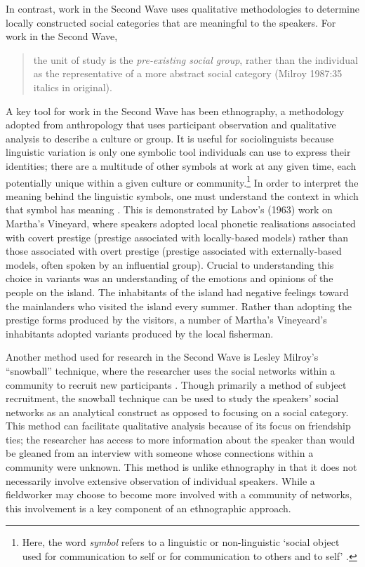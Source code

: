 In contrast, work in the Second Wave uses qualitative methodologies to determine locally constructed social categories that are meaningful to the speakers.  For work in the Second Wave,

\begin{quote}
	the unit of study is the \textit{pre-existing social group}, rather than the individual as the representative of a more abstract social category (Milroy 1987:35 italics in original).
\end{quote}\nocite{milroy1987}

\noindent A key tool for work in the Second Wave has been ethnography, a methodology adopted from anthropology that uses participant observation and qualitative analysis to describe a culture or group.  It is useful for sociolinguists because linguistic variation is only one symbolic tool individuals can use to express their identities; there are a multitude of other symbols at work at any given time, each potentially unique within a given culture or community.\footnote{Here, the word \textit{symbol} refers to a linguistic or non-linguistic `social object used for communication to self or for communication to others and to self' \cite[42]{charon1995}.}  In order to interpret the meaning behind the linguistic symbols, one must understand the context in which that symbol has meaning \cite[22]{savilletroike1982}.  This is demonstrated by Labov's (1963) work on Martha's Vineyard, where speakers adopted local phonetic realisations associated with covert prestige (prestige associated with locally-based models) rather than those associated with overt prestige (prestige associated with externally-based models, often spoken by an influential group).  Crucial to understanding this choice in variants was an understanding of the emotions and opinions of the people on the island.  The inhabitants of the island had negative feelings toward the mainlanders who visited the island every summer.  Rather than adopting the prestige forms produced by the visitors, a number of Martha's Vineyeard's inhabitants adopted variants produced by the local fisherman.  \nocite{labov1963}   

Another method used for research in the Second Wave is Lesley Milroy's ``snowball'' technique, where the researcher uses the social networks within a community to recruit new participants \cite[32]{milroygordon2003}.  Though primarily a method of subject recruitment, the snowball technique can be used to study the speakers' social networks as an analytical construct as opposed to focusing on a social category.  This method can facilitate qualitative analysis because of its focus on friendship ties; the researcher has access to more information about the speaker than would be gleaned from an interview with someone whose connections within a community were unknown.  This method is unlike ethnography in that it does not necessarily involve extensive observation of individual speakers.  While a fieldworker may choose to become more involved with a community of networks,  this involvement is a key component of an ethnographic approach.  

